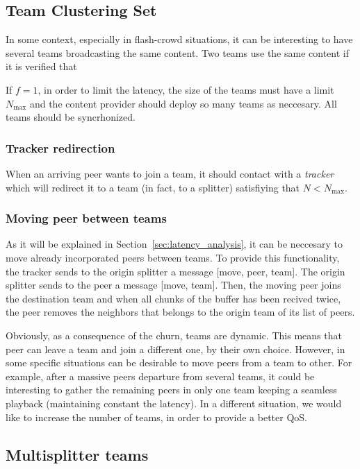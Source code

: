\subsection{Team Clustering Set}
In some context, especially in flash-crowd situations, it can be
interesting to have several teams broadcasting the same content. Two
teams use the same content if it is verified that 

If $f=1$, in order to limit the latency, the size of the teams must
have a limit $N_\text{max}$ and the content provider should deploy so
many teams as neccesary. All teams should be syncrhonized.

\subsubsection{Tracker redirection}
When an arriving peer wants to join a team, it should contact with a
\emph{tracker} which will redirect it to a team (in fact, to a
splitter) satisfiying that $N<N_\text{max}$.

\subsubsection{Moving peer between teams}
As it will be explained in Section~\ref{sec:latency_analysis}, it can
be neccesary to move already incorporated peers between teams. To
provide this functionality, the tracker sends to the origin splitter a
message [move, peer, team]. The origin splitter sends to the peer a
message [move, team]. Then, the moving peer joins the destination team
and when all chunks of the buffer has been recived twice, the peer
removes the neighbors that belongs to the origin team of its list of
peers.


Obviously, as a consequence of the churn, teams are dynamic. This
means that peer can leave a team and join a different one, by their
own choice. However, in some specific situations can be desirable to
move peers from a team to other. For example, after a massive peers
departure from several teams, it could be interesting to gather the
remaining peers in only one team keeping a seamless playback
(maintaining constant the latency). In a different situation, we would
like to increase the number of teams, in order to provide a better
QoS.

\subsection{Multisplitter teams}

